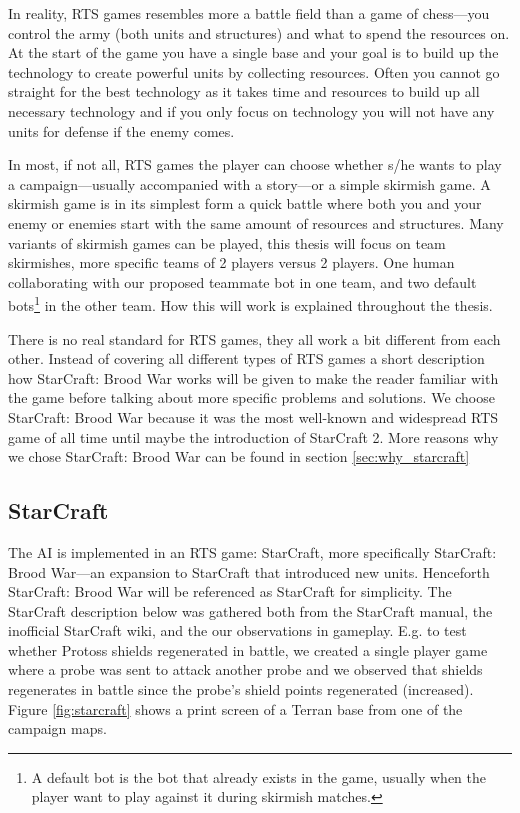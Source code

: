 In reality, RTS games resembles more a battle field than a game of chess—you control the army (both units and structures) and what to spend the resources on. At the start of the game you have a single base and your goal is to build up the technology to create powerful units by collecting resources. Often you cannot go straight for the best technology as it takes time and resources to build up all necessary technology and if you only focus on technology you will not have any units for defense if the enemy comes.

In most, if not all, RTS games the player can choose whether s/he wants to play a campaign—usually accompanied with a story—or a simple skirmish game. A skirmish game is in its simplest form a quick battle where both you and your enemy or enemies start with the same amount of resources and structures. Many variants of skirmish games can be played, this thesis will focus on team skirmishes, more specific teams of 2 players versus 2 players. One human collaborating with our proposed teammate bot in one team, and two default bots\footnote{A default bot is the bot that already exists in the game, usually when the player want to play against it during skirmish matches.} in the other team. How this will work is explained throughout the thesis.

There is no real standard for RTS games, they all work a bit different from each other. Instead of
covering all different types of RTS games a short description how StarCraft: Brood War works will be
given to make the reader familiar with the game before talking about more specific problems and
solutions. We choose StarCraft: Brood War because it was the most well-known and widespread RTS game
of all time until maybe the introduction of StarCraft 2. More reasons why we chose StarCraft: Brood
War can be found in section \ref{sec:why_starcraft}

\subsection{StarCraft}
The AI is implemented in an RTS game: StarCraft, more specifically StarCraft: Brood War—an expansion
to StarCraft that introduced new units. Henceforth StarCraft: Brood War will be referenced as
StarCraft for simplicity. The StarCraft description below was gathered both from the StarCraft
manual\cite{scmanual}, the inofficial StarCraft wiki\cite{scwiki}, and the our observations in
gameplay. E.g. to test whether Protoss shields regenerated in battle, we created a single player
game where a probe was sent to attack another probe and we observed that shields regenerates in
battle since the probe’s shield points regenerated (increased). Figure \ref{fig:starcraft} shows a
print screen of a Terran base from one of the campaign maps.

